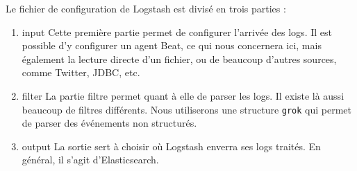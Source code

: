 \documentclass[paper=a4, fontsize=11pt]{scrartcl}
\begin{document}
Le fichier de configuration de Logstash est divisé en trois parties :
\begin{enumerate}
    \item input
    \subitem Cette première partie permet de configurer l'arrivée des logs. Il est possible d'y configurer un agent Beat, ce qui nous concernera ici, mais également la lecture directe d'un fichier, ou de beaucoup d'autres sources, comme Twitter, JDBC, etc.
    \item filter
    \subitem La partie filtre permet quant à elle de parser les logs. Il existe là aussi beaucoup de filtres différents. Nous utiliserons une structure \verb,grok, qui permet de parser des événements non structurés.
    \item output
    \subitem La sortie sert à choisir où Logstash enverra ses logs traités. En général, il s'agit d'Elasticsearch.
\end{enumerate}
\end{document}

